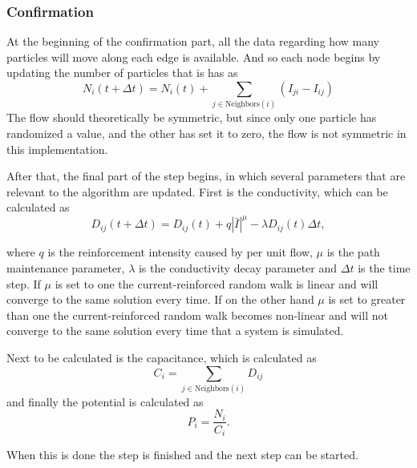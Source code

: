 \subsubsection{Confirmation}
At the beginning of the confirmation part, all the data regarding how many particles will move along each edge is available. And so each node begins by updating the number of particles that is has as
 \begin{equation}
 N_i(t + \Delta t) = N_i(t) + \sum_{j \in \text{Neighbors}(i)} \left( I_{ji} - I_{ij} \right)
 \end{equation}
 The flow should theoretically be symmetric, but since only one particle has randomized a value, and the other has set it to zero, the flow is not symmetric in this implementation.
 
After that, the final part of the step begins, in which several parameters that are relevant to the algorithm are updated. First is the conductivity, which can be calculated as
\begin{equation}
D_{ij}(t + \Delta t) = D_{ij}(t) + q|\bar{I}|^\mu - \lambda D_{ij}(t)\Delta t,
\end{equation}

where $q$ is the reinforcement intensity caused by per unit flow, $\mu$ is the path maintenance parameter, $\lambda$ is the conductivity decay parameter and $\Delta t$ is the time step. If $\mu$ is set to one the current-reinforced random walk is linear and will converge to the same solution every time. If on the other hand $\mu$ is set to greater than one the current-reinforced random walk becomes non-linear and will not converge to the same solution every time that a system is simulated. 

Next to be calculated is the capacitance, which is calculated as 
 \begin{equation}
 C_i = \sum_{j \in \text{Neighbors}(i)} D_{ij}
 \end{equation}
 and finally the potential is calculated as
 \begin{equation}
 P_i = \frac{N_i}{C_i}.
 \end{equation}
 
 \noindent When this is done the step is finished and the next step can be started.